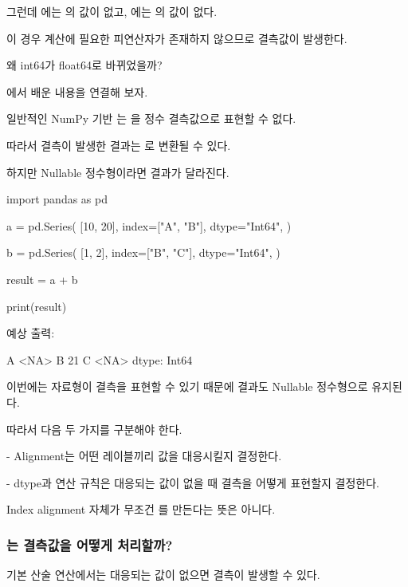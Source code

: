 그런데 에는 의 값이 없고, 에는 의 값이 없다.

이 경우 계산에 필요한 피연산자가 존재하지 않으므로 결측값이 발생한다.

\begin{dhknote}
\begin{dhksmry}[centered]
왜 int64가 float64로 바뀌었을까?
\end{dhksmry}
\end{dhknote}

에서 배운 내용을 연결해 보자.

일반적인 NumPy 기반 는 을 정수 결측값으로 표현할 수 없다.

따라서 결측이 발생한 결과는 로 변환될 수 있다.

하지만 Nullable 정수형이라면 결과가 달라진다.

\begin{dhkcode}
import pandas as pd

a = pd.Series(
    [10, 20],
    index=["A", "B"],
    dtype="Int64",
)

b = pd.Series(
    [1, 2],
    index=["B", "C"],
    dtype="Int64",
)

result = a + b

print(result)
\end{dhkcode}

예상 출력:

\begin{dhkzsh}
A    <NA>
B      21
C    <NA>
dtype: Int64
\end{dhkzsh}

이번에는  자료형이 결측을 표현할 수 있기 때문에 결과도 Nullable 정수형으로 유지된다.

따라서 다음 두 가지를 구분해야 한다.

\begin{dhksmry}
    - Alignment는 어떤 레이블끼리 값을 대응시킬지 결정한다.

    - dtype과 연산 규칙은 대응되는 값이 없을 때 결측을 어떻게 표현할지
      결정한다.
\end{dhksmry}

Index alignment 자체가 무조건 를 만든다는 뜻은 아니다.

\subsubsection{는 결측값을 어떻게 처리할까?}

기본 산술 연산에서는 대응되는 값이 없으면 결측이 발생할 수 있다.

